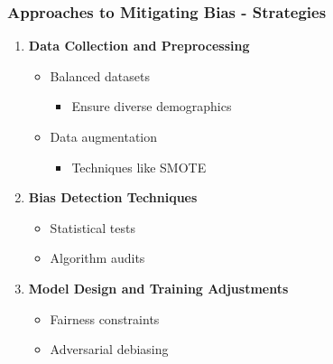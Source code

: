 \documentclass{beamer}
\begin{document}
\begin{frame}[fragile]
    \frametitle{Approaches to Mitigating Bias - Strategies}
    \begin{enumerate}
        \item \textbf{Data Collection and Preprocessing}
            \begin{itemize}
                \item Balanced datasets
                \begin{itemize}
                    \item Ensure diverse demographics
                \end{itemize}
                \item Data augmentation
                \begin{itemize}
                    \item Techniques like SMOTE
                \end{itemize}
            \end{itemize}

        \item \textbf{Bias Detection Techniques}
            \begin{itemize}
                \item Statistical tests
                \item Algorithm audits
            \end{itemize}

        \item \textbf{Model Design and Training Adjustments}
            \begin{itemize}
                \item Fairness constraints
                \item Adversarial debiasing
            \end{itemize}
    \end{enumerate}
\end{frame}
\end{document}
